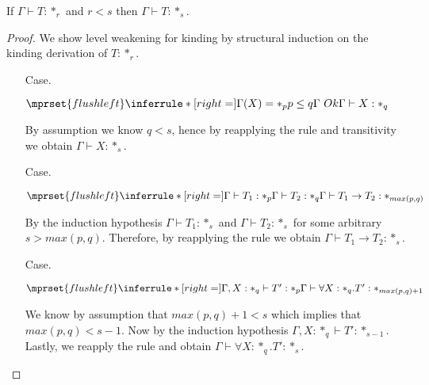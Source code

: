 \begin{lemma}
  If $\Gamma \vdash T:*_r$ and $r < s$ then $\Gamma \vdash T:*_s$.
  \label{lemma:level_weakening_for_kinding_ssf}
\end{lemma}
\begin{proof}
  We show level weakening for kinding by structural induction on the kinding derivation 
  of $T:*_r$.
  \begin{itemize}
  \item[Case.]\ \\
    \begin{center}
      \begin{math}
        $$\mprset{flushleft}
        \inferrule* [right=] {
          \Gamma(X) = *_p
          \\
          p \leq q
          \\
          \Gamma\ Ok
        }{\Gamma \vdash X : *_q}
      \end{math}
    \end{center}
    By assumption we know $q < s$, hence by reapplying the rule and transitivity we 
    obtain $\Gamma \vdash X:*_s$.
    
  \item[Case.]\ \\
    \begin{center}
      \begin{math}
        $$\mprset{flushleft}
        \inferrule* [right=] {
          \Gamma \vdash T_1 : *_p
          \\
          \Gamma \vdash T_2 : *_q
        }{\Gamma \vdash T_1 \rightarrow T_2 : *_{max(p,q)}}
      \end{math}
    \end{center}
    By the induction hypothesis $\Gamma \vdash T_1 : *_s$ and 
    $\Gamma \vdash T_2 : *_s$ for some arbitrary $s > max(p,q)$.  Therefore, by 
    reapplying the rule we obtain $\Gamma \vdash T_1 \rightarrow T_2 : *_s$.
    
  \item[Case.]\ \\
    \begin{center}
      \begin{math}
        $$\mprset{flushleft}
        \inferrule* [right=] {
          \Gamma,X : *_q \vdash T' : *_p
        }{\Gamma \vdash \forall X:*_q.T' : *_{max(p,q)+1}}
      \end{math}
    \end{center}
    We know by assumption that $max(p,q) + 1 < s$ which implies that $max(p,q) < s - 1$.  
    Now by the induction hypothesis $\Gamma,X:*_q \vdash T':*_{s-1}$.  Lastly, we 
    reapply the rule and obtain $\Gamma \vdash \forall X:*_q.T' : *_{s}$.
  \end{itemize}
\end{proof}

